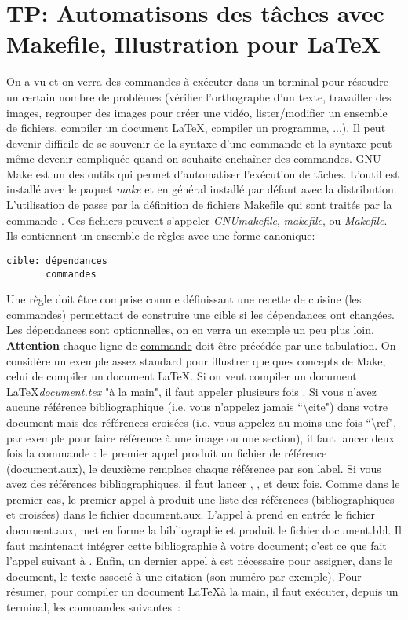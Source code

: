 \section{TP: Automatisons des tâches avec Makefile, Illustration pour  \LaTeX }

On a vu et on verra des commandes à exécuter dans un terminal pour
résoudre un certain nombre de problèmes (vérifier l'orthographe d'un
texte, travailler des images, regrouper des images pour créer une
vidéo, lister/modifier un ensemble de fichiers, compiler un document
\LaTeX, compiler un programme, ...). Il peut devenir difficile de se souvenir de la syntaxe
d'une commande et la syntaxe peut même devenir compliquée quand on
souhaite enchaîner des commandes. GNU Make est un des outils qui
permet d'automatiser l'exécution de tâches. L'outil \make est installé
avec le paquet \emph{make} et en général installé par défaut avec la
distribution. L'utilisation de \make passe par la
définition de fichiers Makefile qui sont traités par la commande \make. Ces fichiers peuvent s'appeler
\emph{GNUmakefile}, \emph{makefile}, ou \emph{Makefile}. Ils
contiennent un ensemble de règles avec une forme canonique:
\begin{verbatim}
cible: dépendances
       commandes
\end{verbatim}
Une règle doit être comprise comme définissant une recette de cuisine (les
commandes) permettant de construire une cible si les dépendances ont
changées. Les dépendances sont optionnelles, on en verra un exemple un
peu plus loin. \textbf{Attention} chaque ligne de \underline{commande} doit être
précédée par une tabulation. On considère un exemple
assez standard pour illustrer quelques concepts de Make, celui de
compiler un document \LaTeX. Si on veut compiler un document \LaTeX \emph{document.tex} "à la main", il faut appeler plusieurs fois \pdflatex. Si vous n'avez aucune référence bibliographique (i.e. vous n'appelez jamais ``\textbackslash{}cite") dans votre document mais des références croisées (i.e. vous appelez au moins une fois ``\textbackslash{}ref", par exemple pour faire référence à une image ou une section), il faut lancer deux fois la commande \pdflatex: le premier appel produit un fichier de référence (document.aux), le deuxième remplace chaque référence par son label. Si vous avez des références bibliographiques, il faut lancer \pdflatex, \bibtex, et \pdflatex deux fois. Comme dans le premier cas, le premier appel à \pdflatex produit une liste des références (bibliographiques et croisées) dans le fichier document.aux. L'appel à \bibtex prend en entrée le fichier document.aux, met en forme la bibliographie et produit le fichier document.bbl. Il faut maintenant intégrer cette bibliographie à votre document; c'est ce que fait l'appel suivant à \pdflatex. Enfin, un dernier appel à \pdflatex est nécessaire pour assigner, dans le document, le texte associé à une citation (son numéro par exemple). Pour résumer, pour compiler un document \LaTeX à la main, il faut exécuter, depuis un terminal, les commandes suivantes~:
